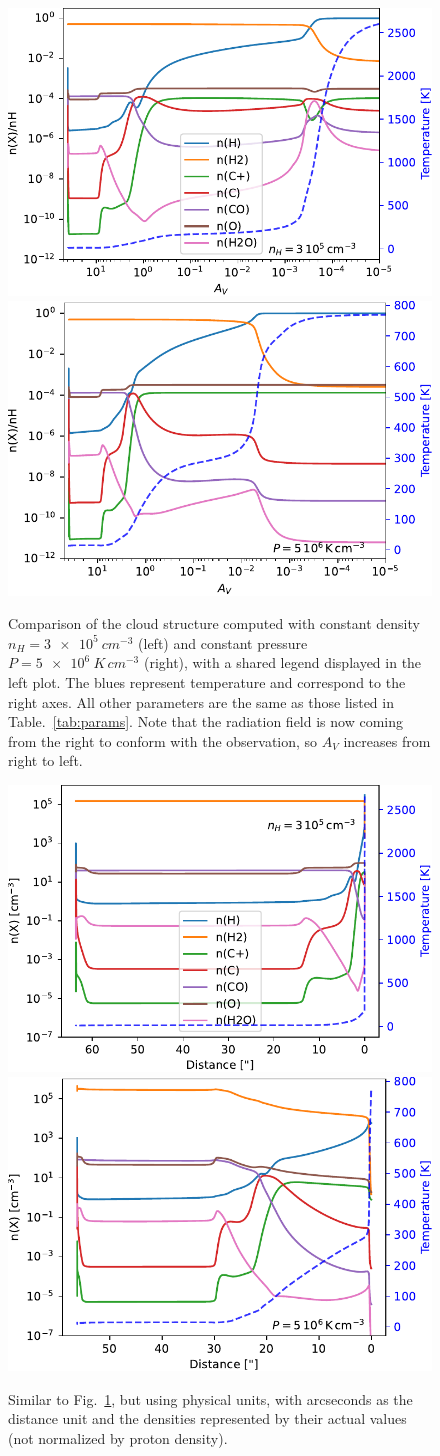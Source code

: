 \documentclass[12pt,a4paper]{article}
\begin{document}
\begin{figure}[ht]
    \centering
    \includegraphics[width=.49\textwidth,keepaspectratio]{struct_nH3e5.pdf}
    \includegraphics[width=.49\textwidth,keepaspectratio]{struct_P5e6.pdf}
    \caption{Comparison of the cloud structure computed with constant density $n_H = \qty{3e5}{cm^{-3}}$ (left) and constant pressure $P = \qty{5e6}{K\,cm^{-3}}$ (right), with a shared legend displayed in the left plot. The blues represent temperature and correspond to the right axes. All other parameters are the same as those listed in Table.~\ref{tab:params}. Note that the radiation field is now coming from the right to conform with the observation, so $A_V$ increases from right to left.} \label{fig:cmp_cstp_cstn}
\end{figure}

\begin{figure}[ht]
    \centering
    \includegraphics[width=.49\textwidth,keepaspectratio]{struct_nH3e5_arcsec.pdf}
    \includegraphics[width=.49\textwidth,keepaspectratio]{struct_P5e6_arcsec.pdf}
    \caption{Similar to Fig.~\ref{fig:cmp_cstp_cstn}, but using physical units, with arcseconds as the distance unit and the densities represented by their actual values (not normalized by proton density).} \label{fig:cmp_cstp_cstn_arcsec}
\end{figure}
\end{document}
